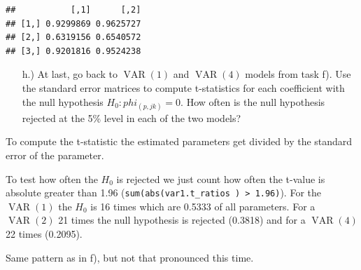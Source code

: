 \documentclass[12pt,a4paper]{article}
\newcommand{\VAR}{\operatorname{VAR}} %
\newenvironment{Shaded}{\begin{snugshade}}{\end{snugshade}}
\newcommand{\NormalTok}[1]{#1}
\newcommand{\OperatorTok}[1]{\textcolor[rgb]{0.81,0.36,0.00}{\textbf{#1}}}
\newcommand{\StringTok}[1]{\textcolor[rgb]{0.31,0.60,0.02}{#1}}
\begin{document}
\begin{verbatim}
##           [,1]      [,2]
## [1,] 0.9299869 0.9625727
## [2,] 0.6319156 0.6540572
## [3,] 0.9201816 0.9524238
\end{verbatim}

\begin{itemize}
  \item[h.)] At last, go back to $\VAR(1)$ and $\VAR(4)$ models from task f). Use the standard error matrices to compute t-statistics for each coefficient with the null hypothesis $H_0: phi_(p,jk) = 0$. How often is the null hypothesis rejected at the 5\% level in each of the two models? 
\end{itemize}

To compute the t-statistic the estimated parameters get divided by the
standard error of the parameter.

\begin{Shaded}
\end{Shaded}

To test how often the \(H_0\) is rejected we just count how often the
t-value is absolute greater than 1.96
(\texttt{sum(abs(var1.t\_ratios\ )\ \textgreater{}\ 1.96)}). For the
\(\VAR(1)\) the \(H_0\) is 16 times which are 0.5333 of all parameters.
For a \(\VAR(2)\) 21 times the null hypothesis is rejected (0.3818) and
for a \(\VAR(4)\) 22 times (0.2095).

Same pattern as in f), but not that pronounced this time.
\end{document}
